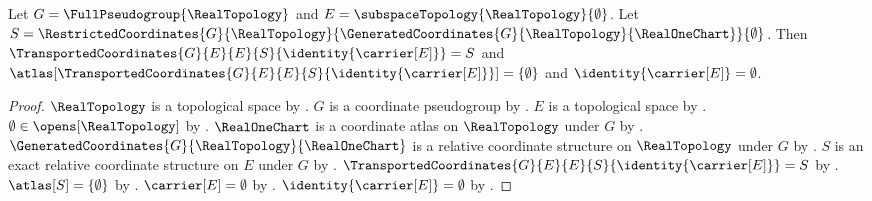 \begin{theorem}\label{closed_empty_transport_consumer}
    Let $G=\FullPseudogroup{\RealTopology}$ and $E=\subspaceTopology{\RealTopology}{\emptyset}$.
    Let $S=\RestrictedCoordinates{G}{\RealTopology}{\GeneratedCoordinates{G}{\RealTopology}{\RealOneChart}}{\emptyset}$.
    Then $\TransportedCoordinates{G}{E}{E}{S}{\identity{\carrier[E]}}=S$ and
        $\atlas[\TransportedCoordinates{G}{E}{E}{S}{\identity{\carrier[E]}}]=\{\emptyset\}$ and
        $\identity{\carrier[E]}=\emptyset$.
\end{theorem}
\begin{proof}
    $\RealTopology$ is a topological space by .
    $G$ is a coordinate pseudogroup by .
    $E$ is a topological space by .
    $\emptyset\in\opens[\RealTopology]$ by .
    $\RealOneChart$ is a coordinate atlas on $\RealTopology$ under $G$ by .
    $\GeneratedCoordinates{G}{\RealTopology}{\RealOneChart}$ is a relative coordinate structure
        on $\RealTopology$ under $G$ by .
    $S$ is an exact relative coordinate structure on $E$ under $G$ by .
    $\TransportedCoordinates{G}{E}{E}{S}{\identity{\carrier[E]}}=S$ by .
    $\atlas[S]=\{\emptyset\}$ by .
    $\carrier[E]=\emptyset$ by .
    $\identity{\carrier[E]}=\emptyset$ by .
\end{proof}
